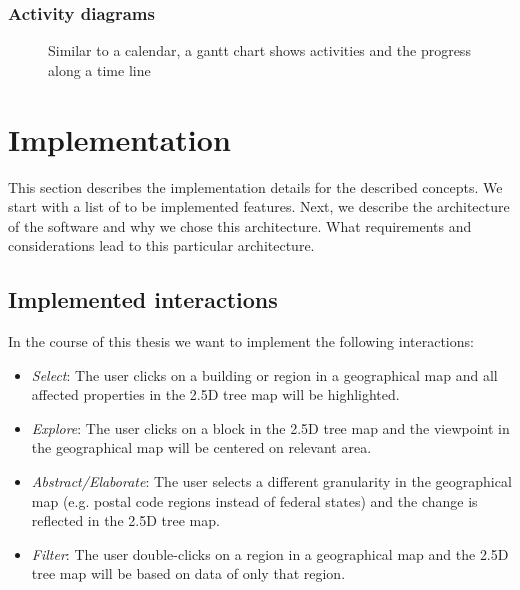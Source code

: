 \documentclass{article}
\newcommand{\tmap}{\textsc{2.5D} tree map}
\begin{document}
\subsubsection{Activity diagrams} 
\begin{figure}
  \centering
    \qquad
    \caption{Similar to a calendar, a gantt chart shows activities and the progress along a time line}%
    \label{fig:concept:chart-types:geographical}
\end{figure}

\clearpage
\section{Implementation}

This section describes the implementation details for the described concepts.
We start with a list of to be implemented features.
Next, we describe the architecture of the software and why we chose this architecture.
What requirements and considerations lead to this particular architecture.


\subsection{Implemented interactions}

In the course of this thesis we want to implement the following interactions:
\begin{itemize}
  \item
    \emph{Select}: The user clicks on a building or region in a geographical map and all affected properties in the \tmap{} will be highlighted.
  \item
    \emph{Explore}: The user clicks on a block in the \tmap{} and the viewpoint in the geographical map will be centered on relevant area.
  \item
    \emph{Abstract/Elaborate}: The user selects a different granularity in the geographical map (e.g. postal code regions instead of federal states) and the change is reflected in the \tmap{}.
  \item
    \emph{Filter}: The user double-clicks on a region in a geographical map and the \tmap{} will be based on data of only that region.
\end{itemize}
\end{document}
